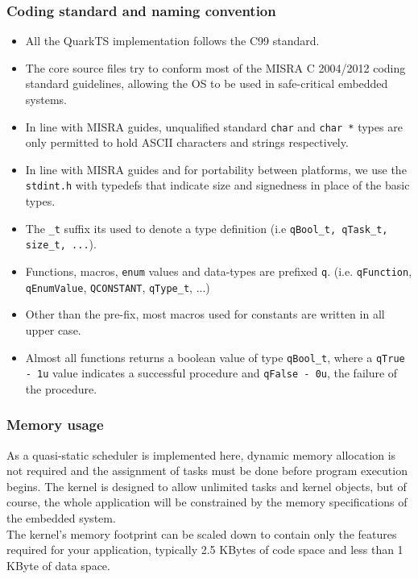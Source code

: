 \subsubsection{Coding standard and naming convention}

\begin{itemize}
    \item All the QuarkTS implementation follows the C99 standard.
    \item The core source files try to conform most of the MISRA C 2004/2012 coding standard guidelines, allowing the OS to be used in safe-critical embedded systems. 
    \item In line with MISRA guides, unqualified standard \lstinline{char} and \lstinline{char *} types are only permitted to hold ASCII characters and strings respectively.
    \item In line with MISRA guides and for portability between platforms, we use the \lstinline{stdint.h} with typedefs that indicate size and signedness in place of the basic types.
    \item The \lstinline{_t} suffix its used to denote a type definition (i.e \lstinline{qBool_t, qTask_t, size_t, ...}).   
    \item Functions, macros, \lstinline{enum} values and data-types are prefixed \lstinline{q}. (i.e. \lstinline{qFunction}, \lstinline{qEnumValue}, \lstinline{QCONSTANT}, \lstinline{qType_t}, ...)
    \item Other than the pre-fix, most macros used for constants are written in all upper case.
    \item Almost all functions returns a boolean value of type \lstinline{qBool_t}, where a \lstinline{qTrue - 1u}  value indicates a successful procedure and \lstinline{qFalse - 0u}, the failure of the procedure.
\end{itemize}

\subsubsection{Memory usage}
As a quasi-static scheduler is implemented here, dynamic memory allocation is not required and the assignment of tasks must be done before program execution begins.
The kernel is designed to allow unlimited tasks and kernel objects, but of course, the whole application will be constrained by the memory specifications of the embedded system. \\
The kernel's memory footprint can be scaled down to contain only the features required for your application, typically 2.5 KBytes of code space and less than 1 KByte of data space. \\

